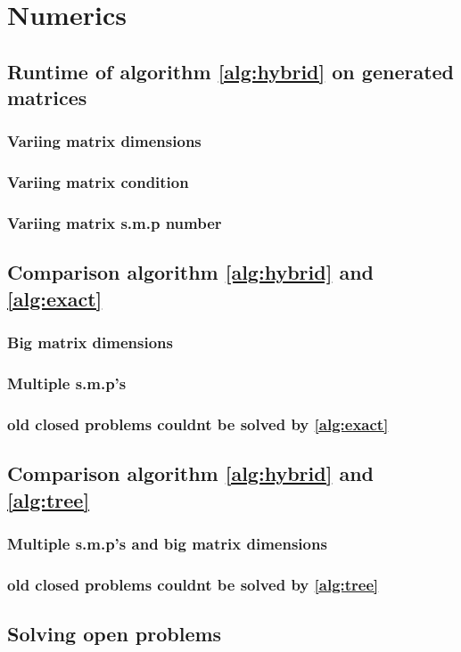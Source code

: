 
\chapter{Numerics} 
\label{ch:numerics}

\section{Runtime of algorithm \ref{alg:hybrid} on generated matrices}

\subsection{Variing matrix dimensions}

\subsection{Variing matrix condition}

\subsection{Variing matrix s.m.p number}

\section{Comparison algorithm \ref{alg:hybrid} and \ref{alg:exact}}

\subsection{Big matrix dimensions}

\subsection{Multiple s.m.p's}

\subsection{old closed problems couldnt be solved by \ref{alg:exact}}

\section{Comparison algorithm \ref{alg:hybrid} and \ref{alg:tree}}

\subsection{Multiple s.m.p's and big matrix dimensions}

\subsection{old closed problems couldnt be solved by \ref{alg:tree}}

\section{Solving open problems}